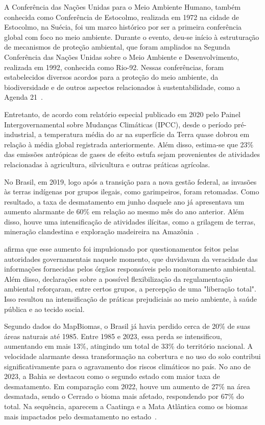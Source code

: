     A Conferência das Nações Unidas para o Meio Ambiente Humano, também conhecida como Conferência de Estocolmo, 
    realizada em 1972 na cidade de Estocolmo, na Suécia, foi um marco histórico por ser a primeira conferência 
    global com foco no meio ambiente. Durante o evento, deu-se início à estruturação de mecanismos de proteção 
    ambiental, que foram ampliados na Segunda Conferência das Nações Unidas sobre o Meio Ambiente e 
    Desenvolvimento, realizada em 1992, conhecida como Rio-92. Nessas conferências, foram estabelecidos 
    diversos acordos para a proteção do meio ambiente, da biodiversidade e de outros aspectos relacionados à 
    sustentabilidade, como a Agenda 21~\cite{passos2009}.

    Entretanto, de acordo com relatório especial publicado em 2020 pelo Painel Intergovernamental sobre Mudanças Climáticas (IPCC), 
    desde o período pré-industrial, a temperatura média do ar na superfície da Terra quase dobrou em relação à média 
    global registrada anteriormente. Além disso, estima-se que 23\% das emissões antrópicas de gases de efeito estufa 
    sejam provenientes de atividades relacionadas à agricultura, silvicultura e outras práticas agrícolas.

    No Brasil, em 2019, logo após a transição para a nova gestão federal, as invasões às terras 
    indígenas por grupos ilegais, como garimpeiros, foram retomadas. Como resultado, a taxa de desmatamento em 
    junho daquele ano já apresentava um aumento alarmante de 60\% em relação ao mesmo mês do ano anterior. 
    Além disso, houve uma intensificação de atividades ilícitas, como a grilagem de terras, mineração clandestina 
    e exploração madeireira na Amazônia~\cite{barretto2020}.

     afirma que esse aumento foi impulsionado por questionamentos feitos pelas autoridades governamentais 
    naquele momento, que duvidavam da veracidade das informações fornecidas pelos órgãos responsáveis pelo monitoramento ambiental. 
    Além disso, declarações sobre a possível flexibilização da regulamentação ambiental reforçaram, entre certos grupos, a percepção 
    de uma "liberação total". Isso resultou na intensificação de práticas prejudiciais ao meio ambiente, à saúde pública e ao tecido 
    social.

    Segundo dados do MapBiomas, o Brasil já havia perdido cerca de 20\% de suas áreas naturais até 1985. Entre 
    1985 e 2023, essa perda se intensificou, aumentando em mais 13\%, atingindo um total de 33\% do território 
    nacional. A velocidade alarmante dessa transformação na cobertura e no uso do solo contribui significativamente 
    para o agravamento dos riscos climáticos no país. No ano de 2023, a Bahia se destacou como o segundo estado 
    com maior taxa de desmatamento. Em comparação com 2022, houve um aumento de 27\% na área desmatada, sendo o 
    Cerrado o bioma mais afetado, respondendo por 67\% do total. Na sequência, aparecem a Caatinga e a Mata 
    Atlântica como os biomas mais impactados pelo desmatamento no estado~\cite{polcri2024}.
    

